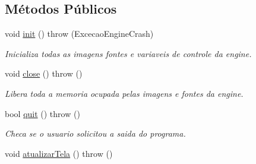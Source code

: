 \subsection*{Métodos Públicos}
\begin{DoxyCompactItemize}
\item 
\hypertarget{classEngine_ab44d76e2ff6057e73d6210cf9af0d89e}{
void \hyperlink{classEngine_ab44d76e2ff6057e73d6210cf9af0d89e}{init} ()  throw (ExcecaoEngineCrash)}
\label{classEngine_ab44d76e2ff6057e73d6210cf9af0d89e}

\begin{DoxyCompactList}\small\item\em Inicializa todas as imagens fontes e variaveis de controle da engine. \item\end{DoxyCompactList}\item 
\hypertarget{classEngine_a6f00047153c2581a74c7c1912bfe5f36}{
void \hyperlink{classEngine_a6f00047153c2581a74c7c1912bfe5f36}{close} ()  throw ()}
\label{classEngine_a6f00047153c2581a74c7c1912bfe5f36}

\begin{DoxyCompactList}\small\item\em Libera toda a memoria ocupada pelas imagens e fontes da engine. \item\end{DoxyCompactList}\item 
bool \hyperlink{classEngine_a48f2c65930db95cea14ab5560d031bc7}{quit} ()  throw ()
\begin{DoxyCompactList}\small\item\em Checa se o usuario solicitou a saida do programa. \item\end{DoxyCompactList}\item 
\hypertarget{classEngine_a081e88135ccc992086baf8511963e185}{
void \hyperlink{classEngine_a081e88135ccc992086baf8511963e185}{atualizarTela} ()  throw ()}
\label{classEngine_a081e88135ccc992086baf8511963e185}


\end{DoxyCompactItemize}
